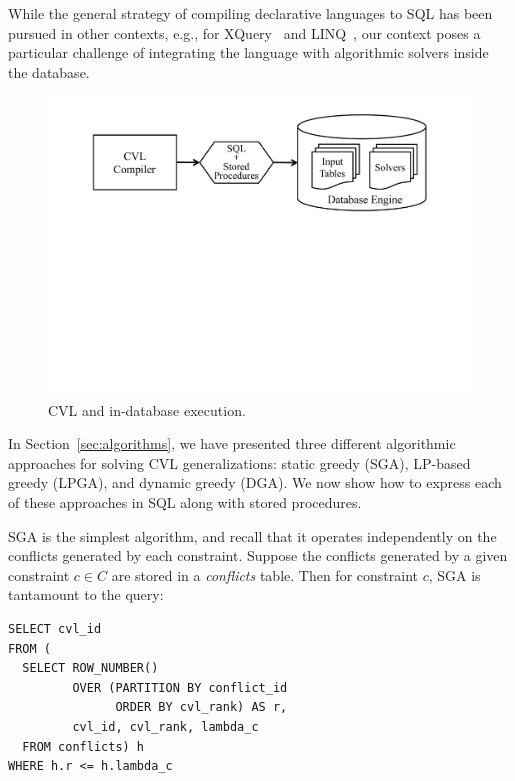 While the general strategy of compiling declarative languages to SQL has been pursued in other contexts, e.g., for XQuery~\cite{pathfinder} and LINQ~\cite{ferry}, our context poses a particular challenge of integrating the language with algorithmic solvers inside the database. 

\begin{figure}[htbp]
\begin{center}
\includegraphics[scale=.35,viewport=400 375 450 550]{figs/indatabase-execution.pdf}
\caption{CVL and in-database execution.}
\label{fig:indatabase}
\end{center}
\end{figure}

In Section~\ref{sec:algorithms}, we have presented three different algorithmic approaches for solving CVL generalizations: static greedy (SGA), LP-based greedy (LPGA), and dynamic greedy (DGA). We now show how to express each of these approaches in SQL along with stored procedures. 

SGA is the simplest algorithm, and recall that it operates independently on the conflicts generated by each constraint. Suppose the conflicts generated by a given constraint $c\in C$ are stored in a \emph{conflicts} table. Then for constraint $c$, SGA is tantamount to the query:

\begin{lstlisting}
SELECT cvl_id
FROM (
  SELECT ROW_NUMBER() 
         OVER (PARTITION BY conflict_id
               ORDER BY cvl_rank) AS r,
         cvl_id, cvl_rank, lambda_c
  FROM conflicts) h
WHERE h.r <= h.lambda_c
\end{lstlisting}

